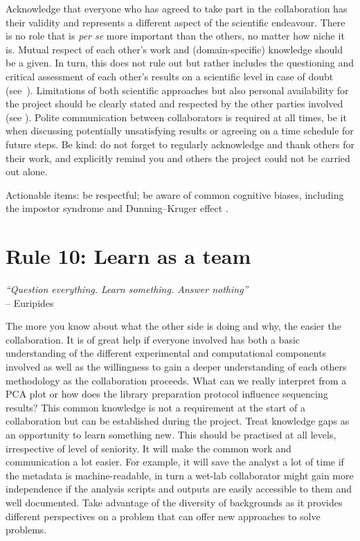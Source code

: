 \documentclass{article}
\begin{document}
Acknowledge that everyone who has agreed to take part in the collaboration has their validity and represents a different aspect of the scientific endeavour. There is no role that is \textit{per se} more important than the others, no matter how niche it is. Mutual respect of each other’s work and (domain-specific) knowledge should be a given. In turn, this does not rule out but rather includes the questioning and critical assessment of each other's results on a scientific level in case of doubt (see~). Limitations of both scientific approaches but also personal availability for the project should be clearly stated and respected by the other parties involved (see ). Polite communication between collaborators is required at all times, be it when discussing potentially unsatisfying results or agreeing on a time schedule for future steps. Be kind: do not forget to regularly acknowledge and thank others for their work, and explicitly remind you and others the project could not be carried out alone.

Actionable items: be respectful; be aware of common cognitive biases, including the impostor syndrome \cite{clance1978imposter} and Dunning–Kruger effect \cite{kruger1999unskilled}.

\section*{Rule 10: Learn as a team} %
\label{rule10_learn}

\begin{flushright}
\rightskip=1cm\textit{``Question everything. Learn something. Answer nothing''} \\
\vspace{.2em}
\rightskip=0cm -- Euripides 
\end{flushright}

The more you know about what the other side is doing and why, the easier the collaboration. It is of great help if everyone involved has both a basic understanding of the different experimental and computational components involved as well as the willingness to gain a deeper understanding of each others methodology as the collaboration proceeds. What can we really interpret from a PCA plot or how does the library preparation protocol influence sequencing results? This common knowledge is not a requirement at the start of a collaboration but can be established during the project. Treat knowledge gaps as an opportunity to learn something new. This should be practised at all levels, irrespective of level of seniority. It will make the common work and communication a lot easier. For example, it will save the analyst a lot of time if the metadata is machine-readable, in turn a wet-lab collaborator might gain more independence if the analysis scripts and outputs are easily accessible to them and well documented. Take advantage of the diversity of backgrounds as it provides different perspectives on a problem that can offer new approaches to solve problems.
\end{document}
